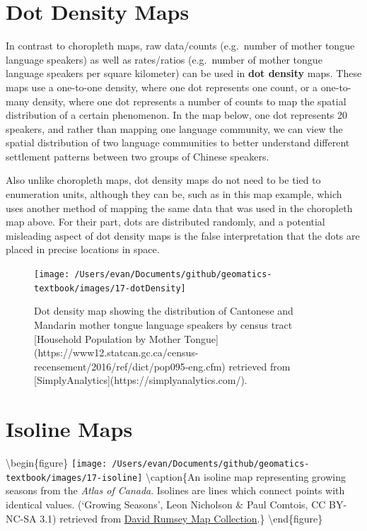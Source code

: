 \documentclass[
]{book}
\begin{document}
\hypertarget{dot-density-maps}{%
\section{Dot Density Maps}\label{dot-density-maps}}

In contrast to choropleth maps, raw data/counts (e.g.~number of mother tongue language speakers) as well as rates/ratios (e.g.~number of mother tongue language speakers per square kilometer) can be used in \textbf{dot density} maps. These maps use a one-to-one density, where one dot represents one count, or a one-to-many density, where one dot represents a number of counts to map the spatial distribution of a certain phenomenon. In the map below, one dot represents 20 speakers, and rather than mapping one language community, we can view the spatial distribution of two language communities to better understand different settlement patterns between two groups of Chinese speakers.

Also unlike choropleth maps, dot density maps do not need to be tied to enumeration units, although they can be, such as in this map example, which uses another method of mapping the same data that was used in the choropleth map above. For their part, dots are distributed randomly, and a potential misleading aspect of dot density maps is the false interpretation that the dots are placed in precise locations in space.

\begin{figure}
\texttt{[image: /Users/evan/Documents/github/geomatics-textbook/images/17-dotDensity]} \caption{Dot density map showing the distribution of Cantonese and Mandarin mother tongue language speakers by census tract [Household Population by Mother Tongue](https://www12.statcan.gc.ca/census-recensement/2016/ref/dict/pop095-eng.cfm) retrieved from [SimplyAnalytics](https://simplyanalytics.com/).}\label{fig:17-dotDensity}
\end{figure}

\hypertarget{isoline-maps}{%
\section{Isoline Maps}\label{isoline-maps}}

\textbackslash begin\{figure\}
\texttt{[image: /Users/evan/Documents/github/geomatics-textbook/images/17-isoline]} \textbackslash caption\{An isoline map representing growing seasons from the \emph{Atlas of Canada}. Isolines are lines which connect points with identical values. (`Growing Seasons', \citet{Norman} Leon Nicholson \& Paul Comtois, CC BY-NC-SA 3.1) retrieved from \href{https://www.davidrumsey.com/luna/servlet/s/c68r55}{David Rumsey Map Collection}.\}\label{fig:17-isoline}
\textbackslash end\{figure\}
\end{document}

